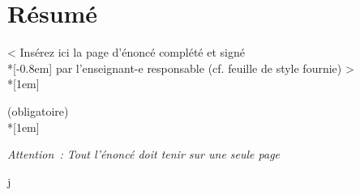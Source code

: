 \thispagestyle{noheader}
\chapter*{Résumé} %
\thispagestyle{noheader}

\vspace{118pt}

\begin{center}
	{\Large < Insérez ici la page d’énoncé complété et signé\\*[-0.8em]
		par l’enseignant-e responsable (cf. feuille de style fournie) >\\*[1em]
		
		(obligatoire)\\*[1em]
	
	\textit{Attention : Tout l’énoncé doit tenir sur une seule page}}
\end{center}j